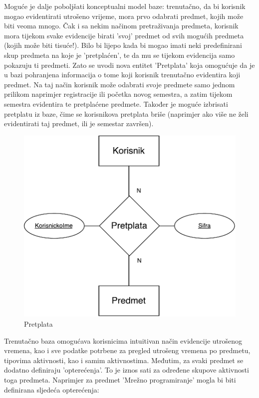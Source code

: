 \documentclass[times, utf8, zavrsni]{fer}
\begin{document}
Moguće je dalje poboljšati konceptualni model baze: trenutačno, da bi korisnik mogao evidentirati utrošeno vrijeme, mora prvo odabrati predmet, kojih može biti veoma mnogo. Čak i sa nekim načinom pretraživanja predmeta, korisnik mora tijekom svake evidencije birati 'svoj' predmet od svih mogućih predmeta (kojih može biti tisuće!). Bilo bi lijepo kada bi mogao imati neki predefinirani skup predmeta na koje je 'pretplaćen', te da mu se tijekom evidencija samo pokazuju ti predmeti. Zato se uvodi nova entitet 'Pretplata' koja omogućuje da je u bazi pohranjena informacija o tome koji korisnik trenutačno evidentira koji predmet. Na taj način korisnik može odabrati svoje predmete samo jednom prilikom naprimjer registracije ili početka novog semestra, a zatim tijekom semestra evidentira te pretplaćene predmete. Također je moguće izbrisati pretplatu iz baze, čime se korisnikova pretplata briše (naprimjer ako više ne želi evidentirati taj predmet, ili je semestar završen).

\begin{figure}[H]
\centering
\includegraphics{img/pretplata.pdf}
\caption{Pretplata}
\label{fig:pretplata}
\end{figure}

Trenutačno baza omogućava korisnicima intuitivan način evidencije utrošenog vremena, kao i sve podatke potrbene za pregled utrošeng vremena po predmetu, tipovima aktivnosti, kao i samim aktivnostima. Međutim, za svaki predmet se dodatno definiraju 'opterećenja'. To je iznos sati za određene skupove aktivnosti toga predmeta. Naprimjer za predmet 'Mrežno programiranje' mogla bi biti definirana sljedeća opterećenja:
\end{document}
